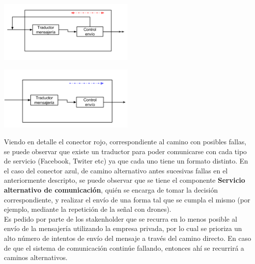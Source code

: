 \documentclass[a4paper, 11pt]{article}
\begin{document}
\centerline{\includegraphics[width=0.5\textwidth]{./diagramas/ArqTP2Envio.png}}
\centerline{\includegraphics[width=0.5\textwidth]{./diagramas/ArqTP2conector2.png}}

Viendo en detalle el conector rojo, correspondiente al camino con posibles fallas, se puede observar que existe un traductor para poder comunicarse con cada tipo de servicio (Facebook, Twiter etc) ya que cada uno tiene un formato distinto.
En el caso del conector azul, de camino alternativo antes sucesivas fallas en el anteriormente descripto, se puede observar que se tiene el componente \textbf{Servicio alternativo de comunicación}, quién se encarga de tomar la decisión correspondiente, y realizar el envío de una forma tal que se cumpla el mismo (por ejemplo, mediante la repetición de la señal con drones).\\


Es pedido por parte de los stakenholder que se recurra en lo menos posible al envío de la mensajería utilizando la empresa privada, por lo cual se prioriza un alto número de intentos de envío del mensaje a través del camino directo. En caso de que el sistema de comunicación continúe fallando, entonces ahí se recurrirá a caminos alternativos. \\
\end{document}
